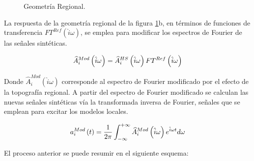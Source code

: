 \documentclass[spanish,letterpaper,12pt,twoside,openany]{article}
\begin{document}
\begin{figure}[H]
	\centering
	\hspace{.25 cm}
	\vspace{-.5 cm}
    \caption{Geometría Regional.}
    \label{fig:geolocreg}
    \vspace{-1 cm}
\end{figure}
%

La respuesta de la geometría regional de la figura \ref{fig:geolocreg}b, en términos de funciones de transferencia $FT^{Ref} \left(\hat{i} \omega \right)$, se emplea para modificar los espectros de Fourier de las señales sintéticas.
%
\begin{large}
	\begin{align}\label{eq:espfoumod}
		\widehat{A}^{Mod}_{i} \left( \hat{i} \omega \right) = \widehat{A}^{HS}_{i} \left( \hat{i} \omega \right) FT^{Ref} \left( \hat{i} \omega \right)
	\vspace{-1 cm}
	\end{align}
\end{large}
%
Donde $\widehat{A}^{Mod}_{i} \left( \hat{i} \omega \right)$ corresponde al espectro de Fourier modificado por el efecto de la topografía regional. A partir del espectro de Fourier modificado se calculan las nuevas señales sintéticas vía la transformada inversa de Fourier, señales que se emplean para excitar los modelos locales.
%
\begin{large}
	\begin{align}\label{eq:fourinv}
		a_{i}^{Mod} \left( t \right) = \dfrac{1}{2 \pi} \int_{-\infty}^{+\infty} \widehat{A}^{Mod}_{i} \left( \hat{i} \omega \right) e^{\hat{i} \omega t} d \omega
	\vspace{-1 cm}
	\end{align}
\end{large}
%
El proceso anterior se puede resumir en el siguiente esquema:
\end{document}
